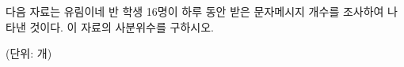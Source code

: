 다음 자료는 유림이네 반 학생 16명이 하루 동안 받은 문자메시지 개수를 조사하여 나타낸 것이다. 이 자료의 사분위수를 구하시오.\par{\raggedleft\small (단위: 개)\par}
